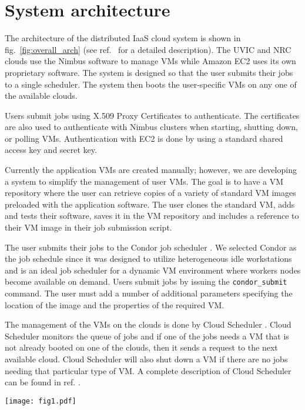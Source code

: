\documentclass[10pt, conference, compsocconf]{IEEEtran}
\begin{document}
\section{System architecture}

The architecture of the distributed IaaS cloud system is shown in 
fig.~\ref{fig:overall_arch} (see ref.~\cite{cloud-scheduler} for a detailed 
description).
The UVIC and NRC clouds use the Nimbus software to manage VMs \cite{nimbus} 
while Amazon EC2 uses its own proprietary software.
The system is designed so that the user submits their jobs to a single scheduler.
The system then boots the user-specific VMs on any one of the available clouds.

Users submit jobs using X.509 Proxy Certificates \cite{rfc3820} to authenticate.  
The certificates are also used to authenticate with Nimbus
clusters when starting, shutting down, or polling VMs. 
Authentication with EC2 is done by using a standard shared access key and 
secret key.

Currently the application VMs are created manually; however, we are
developing a system to simplify the management of user VMs.     
The goal is to have a VM repository where the user can retrieve copies 
of a variety of standard VM images preloaded with the application software.
The user clones the standard VM, adds and tests their software,
saves it in the VM repository and includes a reference to their 
VM image in their job submission script.

The user submits their jobs to the Condor job scheduler \cite{condor}.
We selected Condor as the job schedule since it was designed to utilize
heterogeneous idle workstations and is an ideal job scheduler for a dynamic 
VM environment where workers nodes become available on demand.
Users submit jobs by issuing the \texttt{condor\_submit} command.
The user must add a number of additional parameters specifying the
location of the image and the properties of the required VM.

The management of the VMs on the clouds is done by Cloud Scheduler
\cite{cloud-scheduler}.
Cloud Scheduler monitors the queue of jobs and if one of the jobs 
needs a VM that is not already booted on one of the clouds, then it 
sends a request to the next available cloud.
Cloud Scheduler will also shut down a VM if there are no jobs
needing that particular type of VM.
A complete description of Cloud Scheduler can be found in 
ref. \cite{cloud-scheduler}.

\begin{figure*}
\begin{center}
\texttt{[image: fig1.pdf]}
\end{center}
\caption{\label{fig:overall_arch} 
An overview of the architecture used for the system.
A user prepares their VM image and a job script.  
The job script is submitted to the job scheduler.
The Cloud Scheduler reads the job queue and makes a request to boot the 
user VM on one of the available clouds.
Once there are no more user jobs requiring that VM type, the Cloud 
Scheduler makes a request to the proper cloud to shutdown the user VM.
}
\end{figure*}
\end{document}
